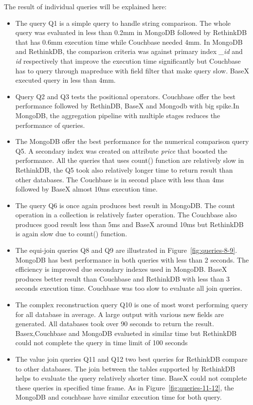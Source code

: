 The result of individual queries will be explained here: 
 \begin{itemize}
 \item 
 The query Q1 is a simple query to handle string comparison. The whole query was evaluated  in less than 0.2mm in MongoDB followed by RethinkDB that has 0.6mm execution time while Couchbase needed 4mm. In MongoDB and RethinkDB, the comparison criteria was against primary index \textit{\_id} and \textit{id} respectively that improve the execution time significantly but Couchbase has to query through mapreduce with field filter that make query slow. BaseX executed query in less than 4mm.
 \item 
 Query Q2 and Q3 tests the positional operators. Couchbase offer the best performance followed by RethinDB, BaseX and Mongodb with big spike.In MongoDB, the aggregation pipeline with multiple stages reduces the performance of queries.
  \item 
  The MongoDB offer the best performance for the numerical comparison query Q5. A secondary index was created on attribute \textit{price} that boosted the performance. All the queries that uses count() function  are relatively slow in RethinkDB, the Q5 took also relatively longer time to return result than other databases. The Couchbase  is in second place with less than 4ms followed by BaseX almost 10ms execution time. 
  \item The query Q6 is once again produces best result in MongoDB. The count operation in a collection is relatively faster operation. The Couchbase also produces good result less than 5ms and BaseX around 10ms but RethinkDB is again slow due to count() function.
  \item The equi-join queries Q8 and Q9  are illustrated in Figure~\ref{fig:queries-8-9}. MongoDB has best performance in both queries with less than 2 seconds. The efficiency is improved due secondary indexes used in MongoDB. BaseX produces better result than Couchbase and RethinkDB with less than 3 seconds execution time.  Couchbase  was too slow to evaluate all join queries.
 \item The complex reconstruction query Q10 is one of most worst performing query for all database in average. A large output with various new fields are generated.  All databases took over 90 seconds to return the result. Basex,Couchbase and MongoDB evalueted in similar time but RethinkDB could not complete the query in time limit of 100 seconds 
 
 \item The value join queries  Q11 and Q12  two best queries for RethinkDB compare to other databases. The join between the tables supported by RethinkDB helps to evaluate the query relatively shorter time. BaseX could not complete these queries in specified time frame. As in Figure~\ref{fig:queries-11-12}, the MongoDB and couchbase have similar execution time for both query.
 \end{itemize}
 
